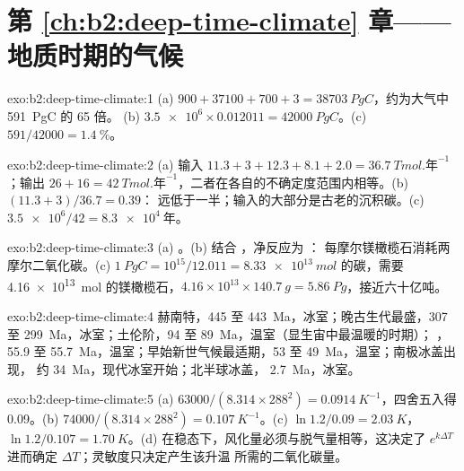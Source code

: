 \section*{第 \ref{ch:b2:deep-time-climate} 章——地质时期的气候}

\begin{solution}{exo:b2:deep-time-climate:1}
(a) $900 + 37100 + 700 + 3 = \qty{38703}{PgC}$，约为大气中 \qty{591}{PgC} 的 65 倍。
(b) $\num{3.5e6}\times0.012011 = \qty{42000}{PgC}$。(c) $591/42000 = \qty{1.4}{\percent}$。
\end{solution}

\begin{solution}{exo:b2:deep-time-climate:2}
(a) 输入 $11.3 + 3 + 12.3 + 8.1 + 2.0 = \qty{36.7}{Tmol.\text{年}^{-1}}$；输出 $26 + 16 =
\qty{42}{Tmol.\text{年}^{-1}}$，二者在各自的不确定度范围内相等。(b) $(11.3 + 3)/36.7 = 0.39$：
远低于一半；输入的大部分是古老的沉积碳。(c) $\num{3.5e6}/42 = \qty{8.3e4}{\text{年}}$。
\end{solution}

\begin{solution}{exo:b2:deep-time-climate:3}
(a) 。(b) 结合 ，净反应为 ：
每摩尔镁橄榄石消耗两摩尔二氧化碳。(c) $\qty{1}{PgC} = 10^{15}/12.011 =
\qty{8.33e13}{mol}$ 的碳，需要 \qty{4.16e13}{mol} 的镁橄榄石，$4.16\times10^{13}
\times\qty{140.7}{g} = \qty{5.86}{Pg}$，接近六十亿吨。
\end{solution}

\begin{solution}{exo:b2:deep-time-climate:4}
赫南特，445 至 \qty{443}{Ma}，冰室；晚古生代最盛，307 至
\qty{299}{Ma}，冰室；土伦阶，94 至 \qty{89}{Ma}，温室（显生宙中最温暖的时期）；
，55.9 至 \qty{55.7}{Ma}，温室；早始新世气候最适期，53 至 \qty{49}{Ma}，温室；南极冰盖出现，
约 \qty{34}{Ma}，现代冰室开始；北半球冰盖，
\qty{2.7}{Ma}，冰室。
\end{solution}

\begin{solution}{exo:b2:deep-time-climate:5}
(a) $63000/(8.314\times288^2) = \qty{0.0914}{K^{-1}}$，四舍五入得 0.09。(b) $74000/(8.314
\times288^2) = \qty{0.107}{K^{-1}}$。(c) $\ln1.2/0.09 = \qty{2.03}{K}$，$\ln 1.2/0.107 =
\qty{1.70}{K}$。(d) 在稳态下，风化量必须与脱气量相等，这决定了 $e^{k
\Delta T}$ 进而确定 $\Delta T$；灵敏度只决定产生该升温
所需的二氧化碳量。
\end{solution}

